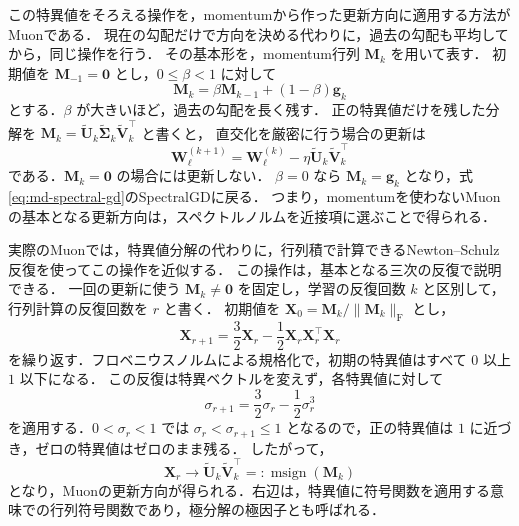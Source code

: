 \documentclass[../main.tex]{subfiles}
\begin{document}
この特異値をそろえる操作を，momentumから作った更新方向に適用する方法がMuonである\cite{jordan2024muon}．
現在の勾配だけで方向を決める代わりに，過去の勾配も平均してから，同じ操作を行う．
その基本形を，momentum行列 $\bm{M}_k$ を用いて表す．
初期値を $\bm{M}_{-1}=\bm{0}$ とし，$0\leq\beta<1$ に対して
\begin{equation}
  \bm{M}_k=\beta\bm{M}_{k-1}+(1-\beta)\bm{g}_k
  \label{eq:md-muon-momentum}
\end{equation}
とする．$\beta$ が大きいほど，過去の勾配を長く残す．
正の特異値だけを残した分解を
$\bm{M}_k=\widetilde{\bm{U}}_k\widetilde{\bm{\Sigma}}_k\widetilde{\bm{V}}_k^\top$ と書くと，
直交化を厳密に行う場合の更新は
\begin{equation}
  \bm{W}_\ell^{(k+1)}
  =\bm{W}_\ell^{(k)}-\eta\widetilde{\bm{U}}_k\widetilde{\bm{V}}_k^\top
  \label{eq:md-muon-update}
\end{equation}
である．$\bm{M}_k=\bm{0}$ の場合には更新しない．
$\beta=0$ なら $\bm{M}_k=\bm{g}_k$ となり，式\eqref{eq:md-spectral-gd}のSpectralGDに戻る．
つまり，momentumを使わないMuonの基本となる更新方向は，スペクトルノルムを近接項に選ぶことで得られる．

実際のMuonでは，特異値分解の代わりに，行列積で計算できるNewton--Schulz反復を使ってこの操作を近似する．
この操作は，基本となる三次の反復で説明できる\cite{bernstein2024norm}．
一回の更新に使う $\bm{M}_k\ne\bm{0}$ を固定し，学習の反復回数 $k$ と区別して，行列計算の反復回数を $r$ と書く．
初期値を $\bm{X}_0=\bm{M}_k/\|\bm{M}_k\|_{\mathrm F}$ とし，
\begin{equation}
  \bm{X}_{r+1}
  =\frac32\bm{X}_r-\frac12\bm{X}_r\bm{X}_r^\top\bm{X}_r
  \label{eq:md-newton-schulz}
\end{equation}
を繰り返す．フロベニウスノルムによる規格化で，初期の特異値はすべて $0$ 以上 $1$ 以下になる．
この反復は特異ベクトルを変えず，各特異値に対して
\begin{equation}
  \sigma_{r+1}=\frac32\sigma_r-\frac12\sigma_r^3
  \label{eq:md-newton-schulz-scalar}
\end{equation}
を適用する．$0<\sigma_r<1$ では $\sigma_r<\sigma_{r+1}\leq1$ となるので，正の特異値は $1$ に近づき，ゼロの特異値はゼロのまま残る．
したがって，
\begin{equation}
  \bm{X}_r\longrightarrow
  \widetilde{\bm{U}}_k\widetilde{\bm{V}}_k^\top
  =:\operatorname{msign}(\bm{M}_k)
  \label{eq:md-matrix-sign-limit}
\end{equation}
となり，Muonの更新方向が得られる．右辺は，特異値に符号関数を適用する意味での行列符号関数であり，極分解の極因子とも呼ばれる\cite{eschenhagen2026clarifying}．
\end{document}
